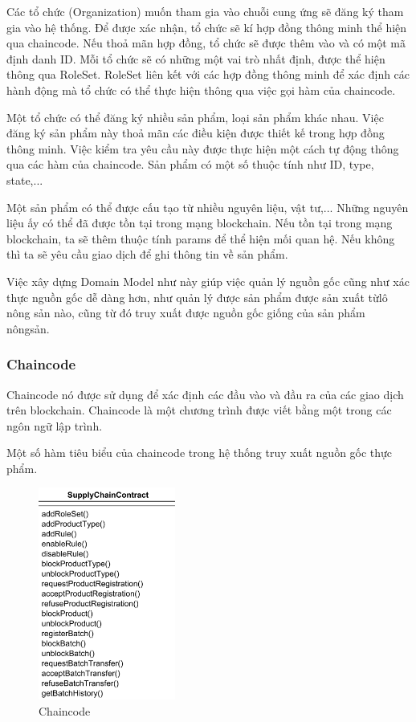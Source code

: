 Các tổ chức (Organization) muốn tham gia vào chuỗi cung ứng sẽ đăng ký tham gia vào hệ thống. Để được xác nhận, 
tổ chức sẽ kí hợp đồng thông minh thể hiện qua chaincode. Nếu thoả mãn hợp đồng, 
tổ chức sẽ được thêm vào và có một mã định danh ID. Mỗi tổ chức sẽ có những một vai trò nhất định, được thể hiện
thông qua RoleSet. RoleSet liên kết với các hợp đồng thông minh để xác định các hành động mà
tổ chức có thể thực hiện thông qua việc gọi hàm của chaincode.

Một tổ chức có thể đăng ký nhiều sản phẩm, loại sản phẩm khác nhau. Việc đăng ký sản phẩm
này thoả mãn các điều kiện được thiết kế trong hợp đồng thông minh. Việc kiểm tra 
yêu cầu này được thực hiện một cách tự động thông qua các hàm của chaincode. Sản phẩm có một 
số thuộc tính như ID, type, state,...

Một sản phẩm có thể được cấu tạo từ nhiều nguyên liệu, vật tư,... Những nguyên liệu ấy
có thể đã được tồn tại trong mạng blockchain. Nếu tồn tại trong mạng blockchain, ta sẽ thêm 
thuộc tính params để thể hiện mối quan hệ. Nếu không thì ta sẽ yêu cầu giao dịch
để ghi thông tin về sản phẩm\cite{app}. 

Việc xây dựng Domain Model như này giúp việc quản lý nguồn gốc cũng như xác thực nguồn gốc 
dễ dàng hơn, như quản lý được sản phẩm được sản xuất từlô nông sản nào, cũng từ đó truy xuất được nguồn gốc giống của sản phẩm nôngsản.
\subsubsection{Chaincode}
Chaincode nó được sử dụng để xác định các đầu vào và đầu ra của các giao dịch trên blockchain. Chaincode là một chương trình được 
viết bằng một trong các ngôn ngữ lập trình.

Một số hàm tiêu biểu của chaincode trong hệ thống truy xuất nguồn gốc thực phẩm.

\begin{figure}[h]
    \centering
    \includegraphics[width=0.4\textwidth]{images/Smart_Contract.png}
    \caption{Chaincode }
\end{figure}

